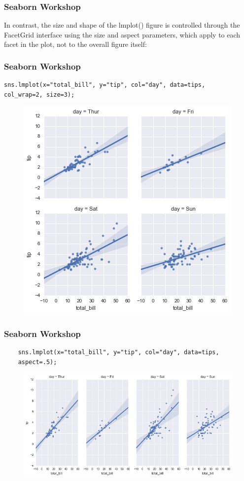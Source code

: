 \documentclass{beamer}
\begin{document}
\begin{frame}[fragile]
	\frametitle{Seaborn Workshop}
	\large
	
In contrast, the size and shape of the lmplot() figure is controlled through the FacetGrid interface using the size and aspect parameters, which apply to each facet in the plot, not to the overall figure itself:
\end{frame}
\begin{frame}[fragile]
	\frametitle{Seaborn Workshop}
	\large
	\begin{verbatim}
sns.lmplot(x="total_bill", y="tip", col="day", data=tips,
col_wrap=2, size=3);
	\end{verbatim}

\begin{figure}
	\centering
	\includegraphics[width=0.7\linewidth]{images/regression_48_0}
\end{figure}
\end{frame}
\begin{frame}[fragile]
	\frametitle{Seaborn Workshop}
	\large
\begin{verbatim}
	sns.lmplot(x="total_bill", y="tip", col="day", data=tips,
	aspect=.5);
\end{verbatim}

\begin{figure}
	\centering
	\includegraphics[width=0.7\linewidth]{images/regression_49_0}
\end{figure}
\end{frame}
\end{document}
